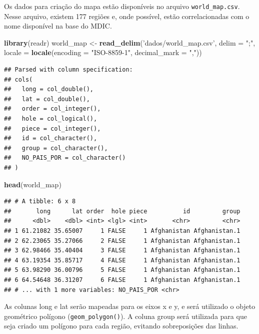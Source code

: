 \documentclass[]{book}
\newenvironment{Shaded}{\begin{snugshade}}{\end{snugshade}}
\newcommand{\KeywordTok}[1]{\textcolor[rgb]{0.13,0.29,0.53}{\textbf{#1}}}
\newcommand{\DataTypeTok}[1]{\textcolor[rgb]{0.13,0.29,0.53}{#1}}
\newcommand{\StringTok}[1]{\textcolor[rgb]{0.31,0.60,0.02}{#1}}
\newcommand{\NormalTok}[1]{#1}
\begin{document}
Os dados para criação do mapa estão disponíveis no arquivo
\texttt{world\_map.csv}. Nesse arquivo, existem 177 regiões e, onde
possível, estão correlacionadas com o nome disponível na base do MDIC.

\begin{Shaded}
\begin{Highlighting}[]
\KeywordTok{library}\NormalTok{(readr)}
\NormalTok{world_map <-}\StringTok{ }\KeywordTok{read_delim}\NormalTok{(}\StringTok{'dados/world_map.csv'}\NormalTok{, }\DataTypeTok{delim =} \StringTok{";"}\NormalTok{,}
                        \DataTypeTok{locale =} \KeywordTok{locale}\NormalTok{(}\DataTypeTok{encoding =} \StringTok{"ISO-8859-1"}\NormalTok{,}
                                        \DataTypeTok{decimal_mark =} \StringTok{","}\NormalTok{))}
\end{Highlighting}
\end{Shaded}

\begin{verbatim}
## Parsed with column specification:
## cols(
##   long = col_double(),
##   lat = col_double(),
##   order = col_integer(),
##   hole = col_logical(),
##   piece = col_integer(),
##   id = col_character(),
##   group = col_character(),
##   NO_PAIS_POR = col_character()
## )
\end{verbatim}

\begin{Shaded}
\begin{Highlighting}[]
\KeywordTok{head}\NormalTok{(world_map)}
\end{Highlighting}
\end{Shaded}

\begin{verbatim}
## # A tibble: 6 x 8
##       long      lat order  hole piece          id         group
##      <dbl>    <dbl> <int> <lgl> <int>       <chr>         <chr>
## 1 61.21082 35.65007     1 FALSE     1 Afghanistan Afghanistan.1
## 2 62.23065 35.27066     2 FALSE     1 Afghanistan Afghanistan.1
## 3 62.98466 35.40404     3 FALSE     1 Afghanistan Afghanistan.1
## 4 63.19354 35.85717     4 FALSE     1 Afghanistan Afghanistan.1
## 5 63.98290 36.00796     5 FALSE     1 Afghanistan Afghanistan.1
## 6 64.54648 36.31207     6 FALSE     1 Afghanistan Afghanistan.1
## # ... with 1 more variables: NO_PAIS_POR <chr>
\end{verbatim}

As colunas long e lat serão mapeadas para os eixos x e y, e será
utilizado o objeto geométrico polígono (\texttt{geom\_polygon()}). A
coluna group será utilizada para que seja criado um polígono para cada
região, evitando sobreposições das linhas.
\end{document}
